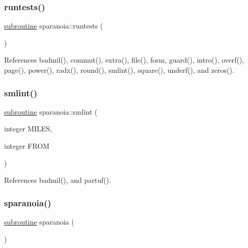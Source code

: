 \mbox{\label{sparanoia_8f90_aff4ac3ebb7f899cf5e1730cd89c06ad1}} 
\subsubsection{\texorpdfstring{runtests()}{runtests()}}
{\footnotesize\ttfamily \hyperlink{M__stopwatch_83_8txt_acfbcff50169d691ff02d4a123ed70482}{subroutine} sparanoia\+::runtests (\begin{DoxyParamCaption}{ }\end{DoxyParamCaption})}



References badmil(), commut(), extra(), file(), form, guard(), intro(), overf(), page(), power(), radx(), round(), smlint(), square(), underf(), and zeros().

\mbox{\label{sparanoia_8f90_a6d17020aa087d1f751f1f0bfcf473d27}} 
\subsubsection{\texorpdfstring{smlint()}{smlint()}}
{\footnotesize\ttfamily \hyperlink{M__stopwatch_83_8txt_acfbcff50169d691ff02d4a123ed70482}{subroutine} sparanoia\+::smlint (\begin{DoxyParamCaption}\item[{integer}]{M\+I\+L\+ES,  }\item[{integer}]{F\+R\+OM }\end{DoxyParamCaption})}



References badmil(), and partuf().

\mbox{\label{sparanoia_8f90_a3924a135a277ffc4f0b2271ccde40373}} 
\subsubsection{\texorpdfstring{sparanoia()}{sparanoia()}}
{\footnotesize\ttfamily \hyperlink{M__stopwatch_83_8txt_acfbcff50169d691ff02d4a123ed70482}{subroutine} sparanoia (\begin{DoxyParamCaption}{ }\end{DoxyParamCaption})}



